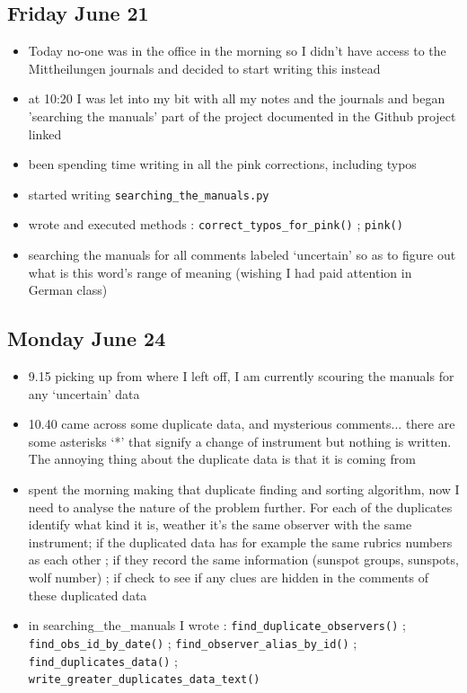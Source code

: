 \documentclass[12pt]{article}
\begin{document}
\subsection{Friday June 21}
\begin{itemize}
    \item Today no-one was in the office in the morning so I didn't have access to the Mittheilungen journals and decided to start writing this instead
    \item at 10:20 I was let into my bit with all my notes and the journals and began 'searching the manuals' part of the project documented in the Github project linked
    \item been spending time writing in all the pink corrections, including typos
    \item started writing \texttt{searching\_the\_manuals.py}
    \item wrote and executed methods : \texttt{correct\_typos\_for\_pink()} ; \texttt{pink()}
    \item searching the manuals for all comments labeled `uncertain' so as to figure out what is this word's range of meaning (wishing I had paid attention in German class)
\end{itemize}
    
\subsection{Monday June 24}
\begin{itemize}
    \item 9.15 picking up from where I left off, I am currently scouring the manuals for any `uncertain' data
    \item 10.40 came across some duplicate data, and mysterious comments... there are some asterisks `*' that signify a change of instrument but nothing is written. The annoying thing about the duplicate data is that it is coming from 
    \item spent the morning making that duplicate finding and sorting algorithm, now I need to analyse the nature of the problem further. For each of the duplicates identify what kind it is, weather it's the same observer with the same instrument; if the duplicated data has for example the same rubrics numbers as each other ; if they record the same information (sunspot groups, sunspots, wolf number) ; if check to see if any clues are hidden in the comments of these duplicated data
    \item in searching\_the\_manuals I wrote : \texttt{find\_duplicate\_observers()} ;\\ \texttt{find\_obs\_id\_by\_date()} ; \texttt{find\_observer\_alias\_by\_id()} ; \texttt{find\_duplicates\_data()} ;\\ \texttt{write\_greater\_duplicates\_data\_text()}
\end{itemize}
    
\end{document}
